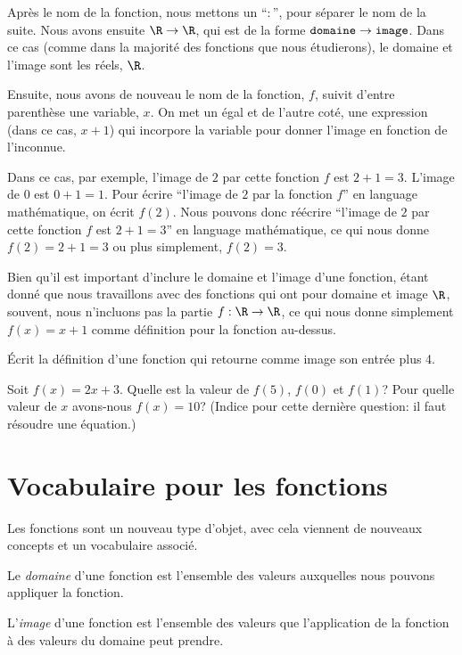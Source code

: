 Après le nom de la fonction, nous mettons un ``$:$'', pour séparer le nom de la suite. Nous avons ensuite $\R \to \R$, qui est de la forme $\text{\texttt{domaine}} \to \text{\texttt{image}}$. Dans ce cas (comme dans la majorité des fonctions que nous étudierons), le domaine et l'image sont les réels, $\R$.

Ensuite, nous avons de nouveau le nom de la fonction, $f$, suivit d'entre parenthèse une variable, $x$. On met un égal et de l'autre coté, une expression (dans ce cas, $x+1$) qui incorpore la variable pour donner l'image en fonction de l'inconnue.

Dans ce cas, par exemple, l'image de $2$ par cette fonction $f$ est $2+1 = 3$. L'image de $0$ est $0+1 = 1$. Pour écrire ``l'image de $2$ par la fonction $f$'' en language mathématique, on écrit $f(2)$. Nous pouvons donc réécrire ``l'image de $2$ par cette fonction $f$ est $2+1 = 3$'' en language mathématique, ce qui nous donne $f(2) = 2+1 = 3$ ou plus simplement, $f(2) = 3$.

Bien qu'il est important d'inclure le domaine et l'image d'une fonction, étant donné que nous travaillons avec des fonctions qui ont pour domaine et image $\R$, souvent, nous n'incluons pas la partie $f: \R \to \R$, ce qui nous donne simplement $f(x) = x + 1$ comme définition pour la fonction au-dessus.

\vspace{1em}

\begin{exercice}
    Écrit la définition d'une fonction qui retourne comme image son entrée plus 4.
\end{exercice}

\begin{exercice}
    Soit $f(x) = 2x + 3$. Quelle est la valeur de $f(5)$, $f(0)$ et $f(1)$? Pour quelle valeur de $x$ avons-nous $f(x) = 10$? (Indice pour cette dernière question: il faut résoudre une équation.)
\end{exercice}

\section{Vocabulaire pour les fonctions}

Les fonctions sont un nouveau type d'objet, avec cela viennent de nouveaux concepts et un vocabulaire associé.

\begin{definition}
    Le \emph{domaine} d'une fonction est l'ensemble des valeurs auxquelles nous pouvons appliquer la fonction.
\end{definition}

\begin{definition}
    L'\emph{image} d'une fonction est l'ensemble des valeurs que l'application de la fonction à des valeurs du domaine peut prendre.
\end{definition}